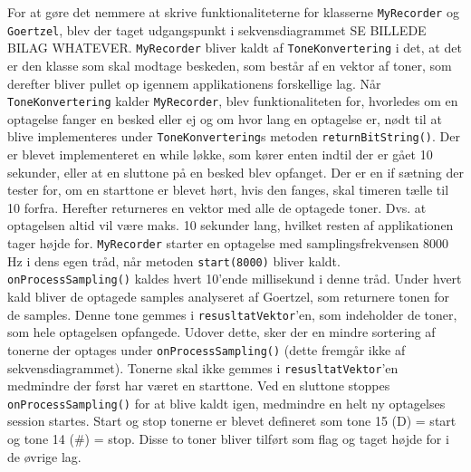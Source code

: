For at gøre det nemmere at skrive funktionaliteterne for klasserne \texttt{MyRecorder} og \texttt{Goertzel}, blev der taget udgangspunkt i sekvensdiagrammet SE BILLEDE BILAG WHATEVER. 
\newline
\texttt{MyRecorder} bliver kaldt af \texttt{ToneKonvertering} i det, at det er den klasse som skal modtage beskeden, som består af en vektor af toner, som derefter bliver pullet op igennem applikationens forskellige lag.
\newline
Når \texttt{ToneKonvertering} kalder \texttt{MyRecorder}, blev funktionaliteten for, hvorledes om en optagelse fanger en besked eller ej og om hvor lang en optagelse er, nødt til at blive implementeres under \texttt{ToneKonvertering}s metoden \texttt{returnBitString()}.
\newline
Der er blevet implementeret en while løkke, som kører enten indtil der er gået 10 sekunder, eller at en sluttone på en besked blev opfanget. Der er en if sætning der tester for, om en starttone er blevet hørt, hvis den fanges, skal timeren tælle til 10 forfra. Herefter returneres en vektor med alle de optagede toner. Dvs. at optagelsen altid vil være maks. 10 sekunder lang, hvilket resten af applikationen tager højde for.
\newline
\texttt{MyRecorder} starter en optagelse med samplingsfrekvensen 8000 Hz i dens egen tråd, når metoden \texttt{start(8000)} bliver kaldt. \texttt{onProcessSampling()} kaldes hvert 10’ende millisekund i denne tråd. Under hvert kald bliver de optagede samples analyseret af Goertzel, som returnere tonen for de samples. Denne tone gemmes i \texttt{resusltatVektor}’en, som indeholder de toner, som hele optagelsen opfangede. Udover dette, sker der en mindre sortering af tonerne der optages under \texttt{onProcessSampling()} (dette fremgår ikke af sekvensdiagrammet). Tonerne skal ikke gemmes i \texttt{resusltatVektor}’en medmindre der først har været en starttone. Ved en sluttone stoppes \texttt{onProcessSampling()} for at blive kaldt igen, medmindre en helt ny optagelses session startes. Start og stop tonerne er blevet  defineret som tone 15 (D) = start og tone 14 (\#) = stop. Disse to toner bliver tilført som flag og taget højde for i de øvrige lag.